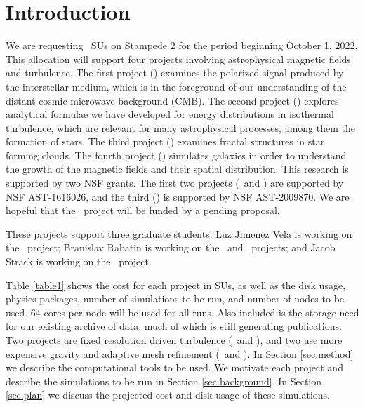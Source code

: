 \section{Introduction}
\label{sec.intro}

We are requesting \SUtotal\ SUs on Stampede 2 for the period beginning October 1,
2022.  This allocation will support four projects involving astrophysical
magnetic fields and turbulence.  The first project  (\nameCMB) examines the polarized signal
produced by the interstellar medium, which is in the foreground of our understanding of
the distant cosmic microwave background (CMB). The second project (\nameTurbulence) explores analytical
formulae we have developed for energy distributions in isothermal turbulence,
which are relevant for many
astrophysical processes, among them the formation of stars.
  The third project (\nameCores) examines fractal structures in star forming clouds. The fourth project (\nameGalaxies)
simulates galaxies in order to understand the growth of the magnetic
fields and their spatial distribution.  This research is supported by two NSF grants.  The first two projects
(\nameTurbulence\ and \nameCores)  
are
supported by NSF AST-1616026, and the third (\nameCMB) is supported by 
NSF AST-2009870.
We are hopeful that the \nameGalaxies\ project will be funded by a pending
proposal.

These projects support three graduate students.  Luz Jimenez Vela is working on
the \nameCores\ project; Branislav Rabatin is working on the \nameTurbulence\
and \nameCMB\ projects; and Jacob Strack is working on the \nameGalaxies\
project.


Table \ref{table1} shows the cost for each project in SUs, as well as the disk
usage, physics packages, number of simulations to be run, and number of nodes to
be used.  64 cores per node will be used for all runs.  Also included is the
storage need for our existing archive of data, much of which is still generating
publications.
Two projects are fixed resolution driven turbulence (\nameTurbulence\ and \nameCMB), and two use
more expensive gravity and adaptive mesh refinement (\nameCores\ and
\nameGalaxies). In Section \ref{sec.method} we
describe the computational tools to be used.  
We motivate each project and describe the simulations to be
run in Section
\ref{sec.background}.  In Section \ref{sec.plan} we
discuss the projected cost  and disk usage of these simulations.

